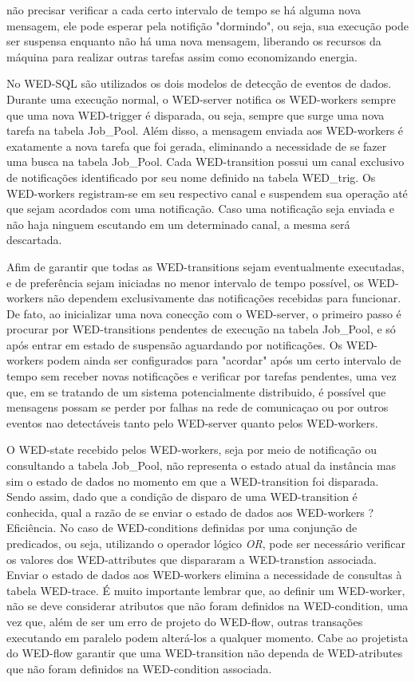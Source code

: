 \documentclass[conference]{IEEEtran}
\begin{document}
não precisar verificar a cada certo intervalo de tempo se há alguma nova mensagem, ele pode esperar pela notifição "dormindo", ou seja, sua execução
pode ser suspensa enquanto não há uma nova mensagem, liberando os recursos da máquina para realizar outras tarefas assim como economizando energia.
\par No WED-SQL são utilizados os dois modelos de detecção de eventos de dados. Durante uma execução normal, o WED-server notifica os WED-workers
sempre que uma nova WED-trigger é disparada, ou seja, sempre que surge uma nova tarefa na tabela Job\_Pool. Além disso, a mensagem enviada aos WED-workers
é exatamente a nova tarefa que foi gerada, eliminando a necessidade de se fazer uma busca na tabela Job\_Pool. Cada WED-transition possui um canal exclusivo
de notificações identificado por seu nome definido na tabela WED\_trig. Os WED-workers registram-se em seu respectivo canal e suspendem sua operação até
que sejam acordados com uma notificação. Caso uma notificação seja enviada e não haja ninguem escutando em um determinado canal, a mesma será descartada.
\par Afim de garantir que todas as WED-transitions sejam eventualmente executadas, e de preferência sejam iniciadas no menor intervalo de tempo possível, os
WED-workers não dependem exclusivamente das notificações recebidas para funcionar. De fato, ao inicializar uma nova conecção com o WED-server, o primeiro
passo é procurar por WED-transitions pendentes de execução na tabela Job\_Pool, e só após entrar em estado de suspensão aguardando por notificações. Os 
WED-workers podem ainda ser configurados para "acordar" após um certo intervalo de tempo sem receber novas notificações e verificar por tarefas pendentes,
uma vez que, em se tratando de um sistema potencialmente distribuido, é possível que mensagens possam se perder por falhas na rede de comunicaçao ou por
outros eventos nao detectáveis tanto pelo WED-server quanto pelos WED-workers. 
\par O WED-state recebido pelos WED-workers, seja por meio de notificação ou consultando a tabela Job\_Pool, não representa o estado atual da instância mas
sim o estado de dados no momento em que a WED-transition foi disparada. Sendo assim, dado que a condição de disparo de uma WED-transition é conhecida,
qual a razão de se enviar o estado de dados aos WED-workers ? Eficiência. No caso de WED-conditions definidas por uma conjunção de predicados, ou seja, 
utilizando o operador lógico \emph{OR}, pode ser necessário verificar os valores dos WED-attributes que dispararam a WED-transtion associada. Enviar o estado
de dados aos WED-workers elimina a necessidade de consultas à tabela WED-trace. É muito importante lembrar que, ao definir um WED-worker, não se deve 
considerar atributos que não foram definidos na WED-condition, uma vez que, além de ser um erro de projeto do WED-flow, outras transações executando
em paralelo podem alterá-los a qualquer momento. Cabe ao projetista do WED-flow garantir que uma WED-transition não dependa de WED-atributes que não
foram definidos na WED-condition associada. 
\end{document}
